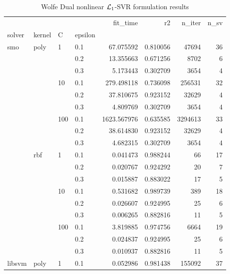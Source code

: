 \begin{table}[H]
\centering
\caption{Wolfe Dual nonlinear $\protect \mathcal{L}_1$-SVR formulation results}
\label{nonlinear_dual_l1_svr_cv_results}
\begin{tabular}{llllrrrr}
\toprule
       &     &     &     &     fit\_time &        r2 &    n\_iter &  n\_sv \\
solver & kernel & C & epsilon &              &           &           &       \\
\midrule
smo & poly & 1   & 0.1 &    67.075592 &  0.810056 &     47694 &    36 \\
       &     &     & 0.2 &    13.355663 &  0.671256 &      8702 &     6 \\
       &     &     & 0.3 &     5.173443 &  0.302709 &      3654 &     4 \\
       &     & 10  & 0.1 &   279.498118 &  0.736098 &    256531 &    32 \\
       &     &     & 0.2 &    37.810675 &  0.923152 &     32629 &     4 \\
       &     &     & 0.3 &     4.809769 &  0.302709 &      3654 &     4 \\
       &     & 100 & 0.1 &  1623.567976 &  0.635585 &   3294613 &    33 \\
       &     &     & 0.2 &    38.614830 &  0.923152 &     32629 &     4 \\
       &     &     & 0.3 &     4.682315 &  0.302709 &      3654 &     4 \\
       & rbf & 1   & 0.1 &     0.041473 &  0.988244 &        66 &    17 \\
       &     &     & 0.2 &     0.020767 &  0.924292 &        20 &     7 \\
       &     &     & 0.3 &     0.015887 &  0.883022 &        17 &     5 \\
       &     & 10  & 0.1 &     0.531682 &  0.989739 &       389 &    18 \\
       &     &     & 0.2 &     0.026607 &  0.924995 &        25 &     6 \\
       &     &     & 0.3 &     0.006265 &  0.882816 &        11 &     5 \\
       &     & 100 & 0.1 &     3.819885 &  0.974756 &      6664 &    19 \\
       &     &     & 0.2 &     0.024837 &  0.924995 &        25 &     6 \\
       &     &     & 0.3 &     0.010937 &  0.882816 &        11 &     5 \\
libsvm & poly & 1   & 0.1 &     0.052986 &  0.981438 &    155092 &    37 \\

\end{tabular}
\end{table}
